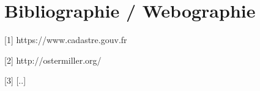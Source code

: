 \chapter{Bibliographie / Webographie}
\begin{description}
\item{[1]} https://www.cadastre.gouv.fr
\item{[2]} http://ostermiller.org/
\item{[3]} [..]
\end{description}
